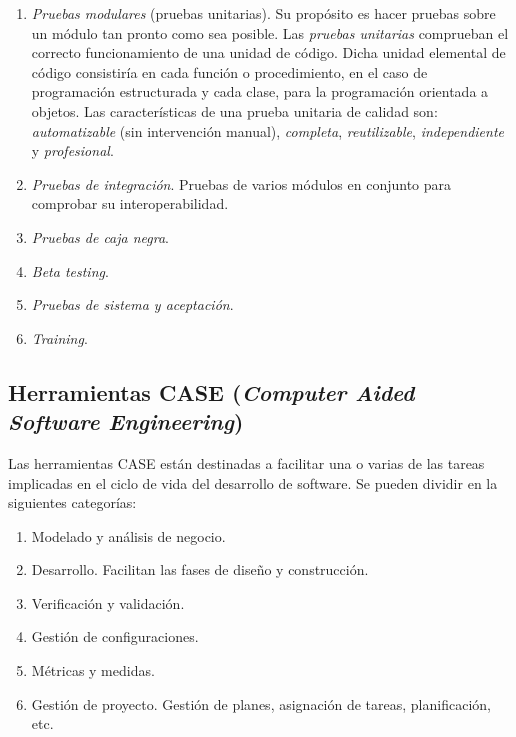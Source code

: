\begin{enumerate}
\item \emph{Pruebas modulares} (pruebas unitarias). Su propósito es hacer pruebas sobre un módulo tan pronto como sea posible. Las \emph{pruebas unitarias} comprueban el correcto funcionamiento de una unidad de código. Dicha unidad elemental de código consistiría en cada función o procedimiento, en el caso de programación estructurada y cada clase, para la programación orientada a objetos. Las características de una prueba unitaria de calidad son: \emph{automatizable} (sin intervención manual), \emph{completa},  \emph{reutilizable}, \emph{independiente} y \emph{profesional}.

\item \emph{Pruebas de integración}. Pruebas de varios módulos en conjunto para comprobar su interoperabilidad.

\item \emph{Pruebas de caja negra}.

\item \emph{Beta testing}.

\item \emph{Pruebas de sistema y aceptación}.

\item \emph{Training}.
\end{enumerate}






\subsection{Herramientas CASE (\emph{Computer Aided Software Engineering})}

Las herramientas CASE están destinadas a facilitar una o varias 
de las tareas implicadas en el ciclo de vida del desarrollo de software. Se 
pueden dividir en la siguientes categorías:

\begin{enumerate}
\item Modelado y análisis de negocio.
\item Desarrollo. Facilitan las fases de diseño y construcción.
\item Verificación y validación.
\item Gestión de configuraciones.
\item Métricas y medidas.
\item Gestión de proyecto. Gestión de planes, asignación de tareas, planificación, etc.
\end{enumerate}




